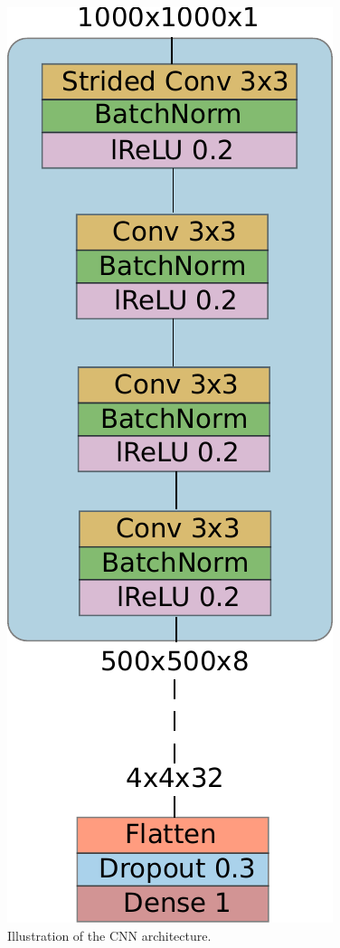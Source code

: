 \documentclass[10pt,conference,compsocconf]{IEEEtran}
\begin{document}
\begin{figure}
    \centering
    \includegraphics[width=0.35\columnwidth]{assets/nn_classifier_arch.pdf}
    \caption{Illustration of the CNN architecture.}
    \label{fig:nn_classifier_arch}
\end{figure}


\end{document}
